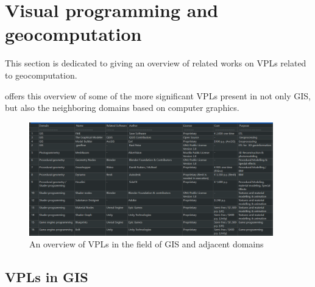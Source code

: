 

\section{Visual programming and geocomputation}
\label{sec:related-geovpl}

This section is dedicated to giving an overview of related works on \ac{VPL}s related to geocomputation.


 offers this overview of some of the more significant \ac{VPL}s present in not only \ac{GIS}, but also the neighboring domains based on computer graphics.

\begin{figure}
  \centering
  \graphicspath{ {../../assets/tables/} }
  \includegraphics[width=400px]{geovpl.png}
  \caption{An overview of VPLs in the field of GIS and adjacent domains}
  \label{fig:geovpl:table}
\end{figure}

\subsection*{ VPLs in GIS }

